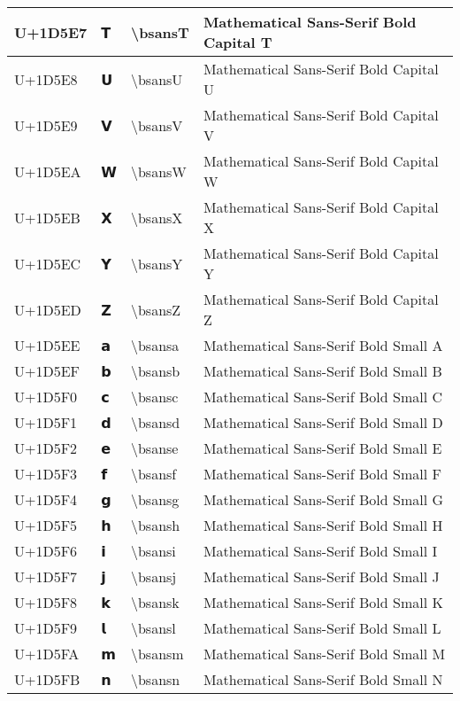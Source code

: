 \begin{table}[h]
\begin{tabulary}{\linewidth}{|L|L|L|L|}
\hline
U+1D5E7 & 𝗧 & {\textbackslash}bsansT & Mathematical Sans-Serif Bold Capital T \\
\hline
U+1D5E8 & 𝗨 & {\textbackslash}bsansU & Mathematical Sans-Serif Bold Capital U \\
\hline
U+1D5E9 & 𝗩 & {\textbackslash}bsansV & Mathematical Sans-Serif Bold Capital V \\
\hline
U+1D5EA & 𝗪 & {\textbackslash}bsansW & Mathematical Sans-Serif Bold Capital W \\
\hline
U+1D5EB & 𝗫 & {\textbackslash}bsansX & Mathematical Sans-Serif Bold Capital X \\
\hline
U+1D5EC & 𝗬 & {\textbackslash}bsansY & Mathematical Sans-Serif Bold Capital Y \\
\hline
U+1D5ED & 𝗭 & {\textbackslash}bsansZ & Mathematical Sans-Serif Bold Capital Z \\
\hline
U+1D5EE & 𝗮 & {\textbackslash}bsansa & Mathematical Sans-Serif Bold Small A \\
\hline
U+1D5EF & 𝗯 & {\textbackslash}bsansb & Mathematical Sans-Serif Bold Small B \\
\hline
U+1D5F0 & 𝗰 & {\textbackslash}bsansc & Mathematical Sans-Serif Bold Small C \\
\hline
U+1D5F1 & 𝗱 & {\textbackslash}bsansd & Mathematical Sans-Serif Bold Small D \\
\hline
U+1D5F2 & 𝗲 & {\textbackslash}bsanse & Mathematical Sans-Serif Bold Small E \\
\hline
U+1D5F3 & 𝗳 & {\textbackslash}bsansf & Mathematical Sans-Serif Bold Small F \\
\hline
U+1D5F4 & 𝗴 & {\textbackslash}bsansg & Mathematical Sans-Serif Bold Small G \\
\hline
U+1D5F5 & 𝗵 & {\textbackslash}bsansh & Mathematical Sans-Serif Bold Small H \\
\hline
U+1D5F6 & 𝗶 & {\textbackslash}bsansi & Mathematical Sans-Serif Bold Small I \\
\hline
U+1D5F7 & 𝗷 & {\textbackslash}bsansj & Mathematical Sans-Serif Bold Small J \\
\hline
U+1D5F8 & 𝗸 & {\textbackslash}bsansk & Mathematical Sans-Serif Bold Small K \\
\hline
U+1D5F9 & 𝗹 & {\textbackslash}bsansl & Mathematical Sans-Serif Bold Small L \\
\hline
U+1D5FA & 𝗺 & {\textbackslash}bsansm & Mathematical Sans-Serif Bold Small M \\
\hline
U+1D5FB & 𝗻 & {\textbackslash}bsansn & Mathematical Sans-Serif Bold Small N \\

\end{tabulary}
\end{table}
